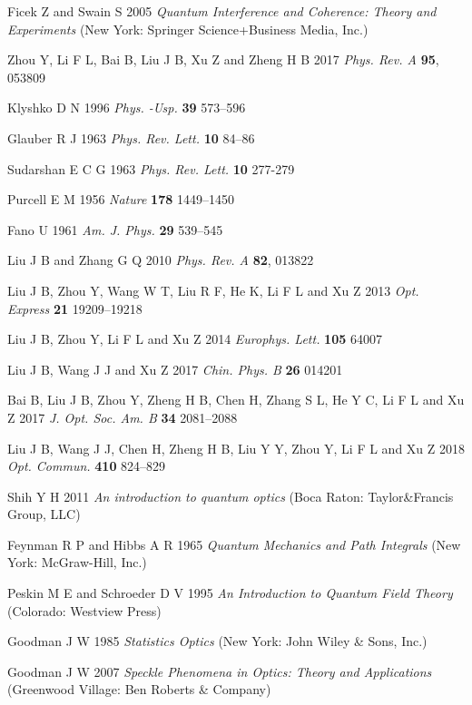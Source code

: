 \documentclass[12pt]{iopart}
\begin{document}
\begin{thebibliography}{99}
 Ficek Z and Swain S 2005 \textit{Quantum Interference and Coherence: Theory and Experiments} (New York: Springer Science+Business Media, Inc.)

 Zhou Y, Li F L, Bai B, Liu J B, Xu Z and Zheng H B 2017 \textit{Phys. Rev. A} \textbf{95}, 053809

 Klyshko D N 1996 \textit{Phys. -Usp.} \textbf{39} 573--596

 Glauber R J 1963 \textit{Phys. Rev. Lett.} \textbf{10} 84--86

 Sudarshan E C G 1963 \textit{Phys. Rev. Lett.} \textbf{10} 277-279

 Purcell E M 1956 \textit{Nature} \textbf{178} 1449--1450

 Fano U 1961 \textit{Am. J. Phys.} \textbf{29} 539--545

 Liu J B and Zhang G Q 2010 \textit{Phys. Rev. A} \textbf{82}, 013822

 Liu J B, Zhou Y, Wang W T, Liu R F, He K, Li F L and Xu Z 2013 \textit{Opt. Express} \textbf{21} 19209--19218

 Liu J B, Zhou Y, Li F L and Xu Z 2014 \textit{Europhys. Lett.} \textbf{105} 64007

 Liu J B, Wang J J and Xu Z 2017 \textit{Chin. Phys. B} \textbf{26} 014201

 Bai B, Liu J B, Zhou Y, Zheng H B, Chen H, Zhang S L, He Y C, Li F L and Xu Z 2017 \textit{J. Opt. Soc. Am. B} \textbf{34} 2081--2088

 Liu J B, Wang J J, Chen H, Zheng H B, Liu Y Y, Zhou Y, Li F L and Xu Z 2018 \textit{Opt. Commun.} \textbf{410} 824--829

 Shih Y H 2011 \textit{An introduction to quantum optics} (Boca Raton: Taylor\&Francis Group, LLC)

 Feynman R P and Hibbs A R 1965 \textit{Quantum Mechanics and Path Integrals} (New York: McGraw-Hill, Inc.)

 Peskin M E and Schroeder D V 1995 \textit{An Introduction to Quantum Field Theory} (Colorado: Westview Press)

 Goodman J W 1985 \textit{Statistics Optics} (New York: John Wiley \& Sons, Inc.)

 Goodman J W 2007 \textit{Speckle Phenomena in Optics: Theory and Applications} (Greenwood Village: Ben Roberts \& Company)

\end{thebibliography}
\end{document}
